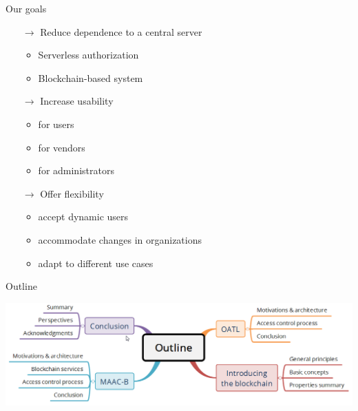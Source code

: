 \begin{frame}{Our goals}
    \begin{itemize}
        \item[$\rightarrow$] Reduce dependence to a central server
        \begin{itemize}
            \item Serverless authorization
            \item Blockchain-based system
        \end{itemize}
        \item[$\rightarrow$] Increase usability
        \begin{itemize}
            \item for users
            \item for vendors
            \item for administrators
        \end{itemize}
        \item[$\rightarrow$] Offer flexibility
        \begin{itemize}
            \item accept dynamic users
            \item accommodate changes in organizations
            \item adapt to different use cases
        \end{itemize}
        
        
    \end{itemize}
\end{frame}

\begin{frame}{Outline}
    \begin{center}
        \includegraphics[scale=0.47]{Figures/Outline.png}
    \end{center}
\end{frame}
